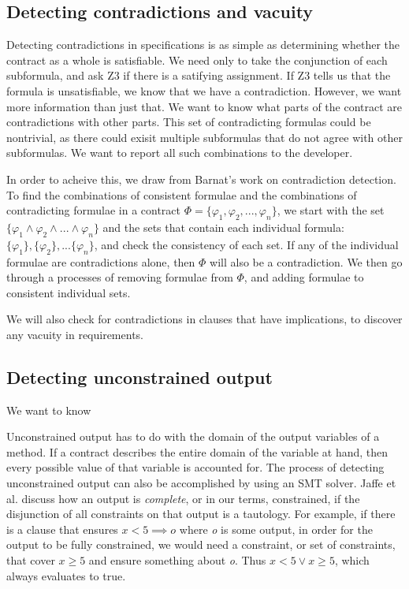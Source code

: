 \documentclass{article}
\newif\ifcomments
\newcommand{\egm}[1]{\ifcomments\textcolor{orange}{egm: #1}\fi}
\begin{document}
\subsection{Detecting contradictions and vacuity}

Detecting contradictions in specifications is as simple as determining whether the contract as a whole is satisfiable.
We need only to take the conjunction of each subformula, and ask Z3 if there is a satifying assignment. If Z3 tells us that the
formula is unsatisfiable, we know that we have a contradiction. However, we want more information than just that. We
want to know what parts of the contract are contradictions with other parts. This set of contradicting formulas could be
nontrivial, as there could exisit multiple subformulas that do not agree with other subformulas. We want to report all
such combinations to the developer.

In order to acheive this, we draw from Barnat's \cite{barnat2016analysing} work on contradiction detection.
To find the combinations of consistent formulae and the combinations of contradicting formulae in a contract
\(\Phi = \{\varphi_{1}, \varphi_{2}, ..., \varphi_{n}\}\), we start with the set \(\{\varphi_{1} \land \varphi_{2} \land ... \land \varphi_{n}\} \)
and the sets that contain each individual formula: \(\{\varphi_{1}\}, \{\varphi_{2}\}, ... \{\varphi_{n}\} \), and check
the consistency of each set. If any of the individual formulae are contradictions alone, then \(\Phi\) will also be a contradiction.
We then go through a processes of removing formulae from \(\Phi\), and adding formulae to consistent individual sets.

We will also check for contradictions in clauses that have implications, to discover any vacuity in requirements.

\subsection{Detecting unconstrained output}

We want to know 

Unconstrained output has to do with the domain of the output variables of a method. If a contract describes the entire
domain of the variable at hand, then every possible value of that variable is accounted for. The process of detecting
unconstrained output can also be accomplished by using an SMT solver. Jaffe et al. \cite{jaffe1989completeness} discuss how
an output is \emph{complete}, or in our terms, constrained, if the disjunction of all constraints on that output is a
tautology. For example, if there is a clause that ensures \(x < 5 \implies o\) where {\it o} is some  output, in order
for the output to be fully constrained, we would need a constraint, or set of constraints, that cover \(x \geq 5\) and ensure 
something about {\it o}. Thus \(x < 5 \lor x \geq 5\), which always evaluates to true. \egm{This statement is not correct. Try it in dafny. What happens is that dafny can prove something about the output when $x < 5$ but it can say nothing about the output when $x \ge 5$ so any assertion that you write will fail in that case.}
\end{document}
